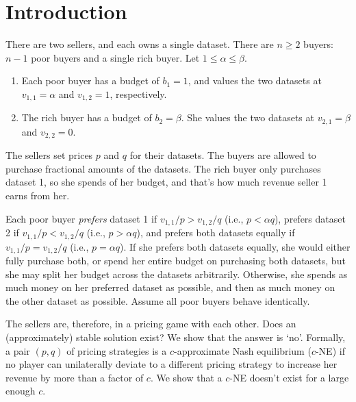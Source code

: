\section{Introduction}
\label{sec:intro}

There are two sellers, and each owns a single dataset.
%
There are $n \ge 2$ buyers: $n-1$ poor buyers and a single rich buyer.
Let $1 \le \alpha \le \beta$.
\begin{enumerate}
\item Each poor buyer has a budget of $b_1 = 1$,
    and values the two datasets at $v_{1,1} = \alpha$ and $v_{1,2} = 1$, respectively.
\item The rich buyer has a budget of $b_2 = \beta$.
    She values the two datasets at $v_{2,1} = \beta$ and $v_{2,2} = 0$.
\end{enumerate}

The sellers set prices $p$ and $q$ for their datasets.
The buyers are allowed to purchase fractional amounts of the datasets.
The rich buyer only purchases dataset 1, so she spends of her budget,
and that's how much revenue seller 1 earns from her.

Each poor buyer \emph{prefers} dataset 1 if $v_{1,1}/p > v_{1,2}/q$ (i.e., $p < \alpha q$),
prefers dataset 2 if $v_{1,1}/p < v_{1,2}/q$ (i.e., $p > \alpha q$),
and prefers both datasets equally if $v_{1,1}/p = v_{1,2}/q$ (i.e., $p = \alpha q$).
If she prefers both datasets equally, she would either fully purchase both,
or spend her entire budget on purchasing both datasets, but she may split
her budget across the datasets arbitrarily.
Otherwise, she spends as much money on her preferred dataset as possible,
and then as much money on the other dataset as possible.
Assume all poor buyers behave identically.

The sellers are, therefore, in a pricing game with each other.
Does an (approximately) stable solution exist? We show that the answer is `no'.
Formally, a pair $(p, q)$ of pricing strategies is a $c$-approximate Nash equilibrium ($c$-NE)
if no player can unilaterally deviate to a different pricing strategy
to increase her revenue by more than a factor of $c$.
We show that a $c$-NE doesn't exist for a large enough $c$.
